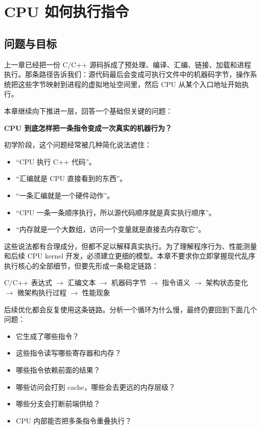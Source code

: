 \chapter{CPU 如何执行指令}

\section{问题与目标}

上一章已经把一份 C/C++ 源码拆成了预处理、编译、汇编、链接、加载和进程执行。那条路径告诉我们：源代码最后会变成可执行文件中的机器码字节，操作系统把这些字节映射到进程的虚拟地址空间里，然后 CPU 从某个入口地址开始执行。

本章继续向下推进一层，回答一个基础但关键的问题：

\begin{center}
\textbf{CPU 到底怎样把一条指令变成一次真实的机器行为？}
\end{center}

初学阶段，这个问题经常被几种简化说法遮住：

\begin{itemize}
  \item ``CPU 执行 C++ 代码''。
  \item ``汇编就是 CPU 直接看到的东西''。
  \item ``一条汇编就是一个硬件动作''。
  \item ``CPU 一条一条顺序执行，所以源代码顺序就是真实执行顺序''。
  \item ``内存就是一个大数组，访问一个变量就是直接去内存取它''。
\end{itemize}

这些说法都有合理成分，但都不足以解释真实执行。为了理解程序行为、性能测量和后续 CPU kernel 开发，必须建立更细的模型。本章不要求你立即掌握现代乱序执行核心的全部细节，但要先形成一条稳定链路：

\begin{center}
C/C++ 表达式 $\rightarrow$ 汇编文本 $\rightarrow$ 机器码字节 $\rightarrow$ 指令语义 $\rightarrow$ 架构状态变化 $\rightarrow$ 微架构执行过程 $\rightarrow$ 性能现象
\end{center}

后续优化都会反复使用这条链路。分析一个循环为什么慢，最终仍要回到下面几个问题：

\begin{itemize}
  \item 它生成了哪些指令？
  \item 这些指令读写哪些寄存器和内存？
  \item 哪些指令依赖前面的结果？
  \item 哪些访问会打到 cache，哪些会去更远的内存层级？
  \item 哪些分支会打断前端供给？
  \item CPU 内部能否把多条指令重叠执行？
\end{itemize}

